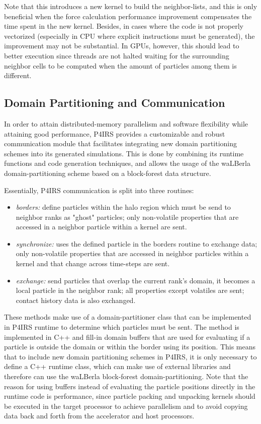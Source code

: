 \documentclass[preprint,12pt]{elsarticle}
\begin{document}
Note that this introduces a new kernel to build the neighbor-lists, and this is only beneficial when the force calculation performance improvement compensates the time spent in the new kernel.
Besides, in cases where the code is not properly vectorized (especially in CPU where explicit instructions must be generated), the improvement may not be substantial.
In GPUs, however, this should lead to better execution since threads are not halted waiting for the surrounding neighbor cells to be computed when the amount of particles among them is different.

\subsection{Domain Partitioning and Communication}
\label{sec:domain_partitioning}

In order to attain distributed-memory parallelism and software flexibility while attaining good performance, P4IRS provides a customizable and robust communication module that facilitates integrating new domain partitioning schemes into its generated simulations.
This is done by combining its runtime functions and code generation techniques, and allows the usage of the waLBerla domain-partitioning scheme based on a block-forest data structure.

Essentially, P4IRS communication is split into three routines:

\begin{itemize}
    \item \emph{borders:} define particles within the halo region which must be send to neighbor ranks as "ghost" particles; only non-volatile properties that are accessed in a neighbor particle within a kernel are sent.
    \item \emph{synchronize:} uses the defined particle in the borders routine to exchange data; only non-volatile properties that are accessed in neighbor particles within a kernel and that change across time-steps are sent.
    \item \emph{exchange:} send particles that overlap the current rank's domain, it becomes a local particle in the neighbor rank; all properties except volatiles are sent; contact history data is also exchanged.
\end{itemize}

These methods make use of a domain-partitioner class that can be implemented in P4IRS runtime to determine which particles must be sent.
The method is implemented in C++ and fill-in domain buffers that are used for evaluating if a particle is outside the domain or within the border using its position.
This means that to include new domain partitioning schemes in P4IRS, it is only necessary to define a C++ runtime class, which can make use of external libraries and therefore can use the waLBerla block-forest domain-partitioning.
Note that the reason for using buffers instead of evaluating the particle positions directly in the runtime code is performance, since particle packing and unpacking kernels should be executed in the target processor to achieve parallelism and to avoid copying data back and forth from the accelerator and host processors.
\end{document}
